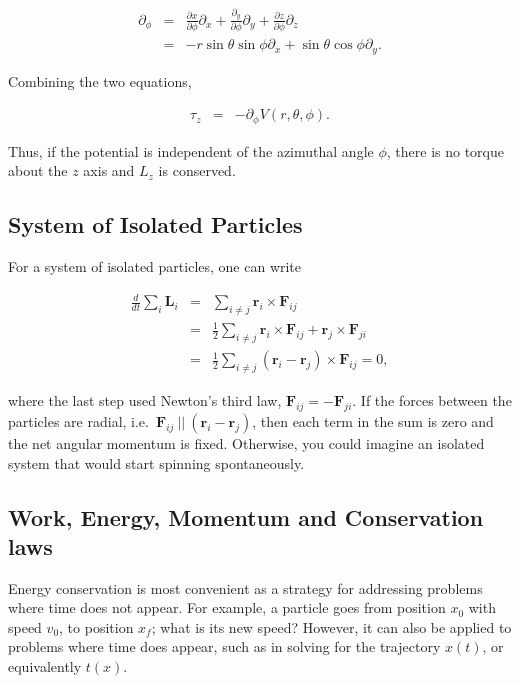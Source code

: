 \documentclass[%
oneside,                 %
final,                   %
10pt]{article}
\begin{document}
\begin{eqnarray}
\partial_\phi&=&\frac{\partial x}{\partial\phi}\partial_x+\frac{\partial_y}{\partial\phi}\partial_y
+\frac{\partial z}{\partial\phi}\partial_z\\
\nonumber
&=&-r\sin\theta\sin\phi\partial_x+\sin\theta\cos\phi\partial_y.
\end{eqnarray}

Combining the two equations,

\begin{eqnarray}
\tau_z&=&-\partial_\phi V(r,\theta,\phi).
\end{eqnarray}

Thus, if the potential is independent of the azimuthal angle $\phi$,
there is no torque about the $z$ axis and $L_z$ is conserved.

\subsection*{System of Isolated Particles}

For a system of isolated particles, one can write

\begin{eqnarray}
\frac{d}{dt}\sum_i\bm{L}_i&=&\sum_{i\ne j}\bm{r}_i\times \bm{F}_{ij}\\
\nonumber
&=&\frac{1}{2}\sum_{i\ne j} \bm{r}_i\times \bm{F}_{ij}+\bm{r}_j\times\bm{F}_{ji}\\
\nonumber
&=&\frac{1}{2}\sum_{i\ne j} (\bm{r}_i-\bm{r}_j)\times\bm{F}_{ij}=0,
\end{eqnarray}

where the last step used Newton's third law,
$\bm{F}_{ij}=-\bm{F}_{ji}$. If the forces between the particles are
radial, i.e.~$\bm{F}_{ij} ~||~ (\bm{r}_i-\bm{r}_j)$, then each term in
the sum is zero and the net angular momentum is fixed. Otherwise, you
could imagine an isolated system that would start spinning
spontaneously.

\subsection*{Work, Energy, Momentum and Conservation laws}

Energy conservation is most convenient as a strategy for addressing
problems where time does not appear. For example, a particle goes
from position $x_0$ with speed $v_0$, to position $x_f$; what is its
new speed? However, it can also be applied to problems where time
does appear, such as in solving for the trajectory $x(t)$, or
equivalently $t(x)$.
\end{document}
